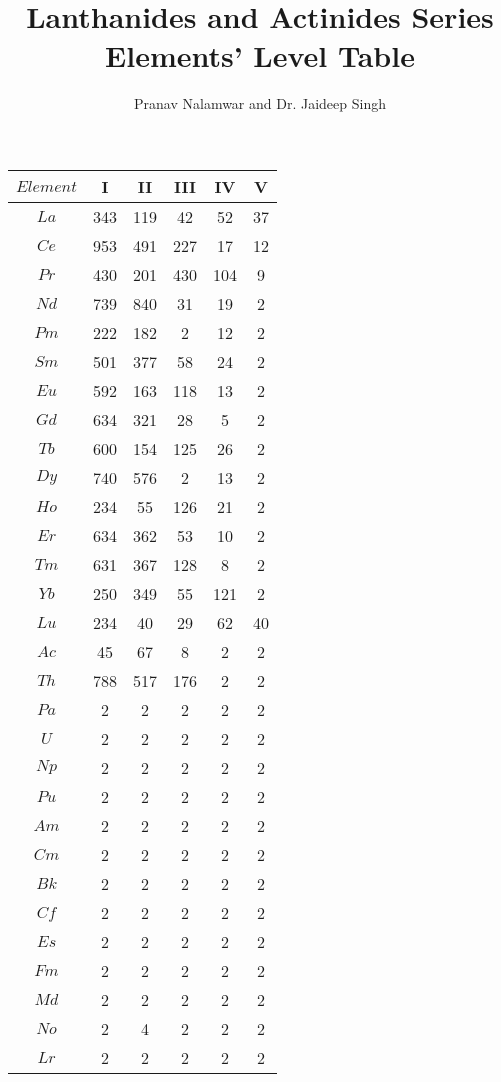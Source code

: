 \documentclass[11pt]{article}
\begin{document}
\title{Lanthanides and Actinides Series Elements' Level Table}
\author{Pranav Nalamwar and Dr. Jaideep Singh}
\maketitle

\begin{tabular}{|c|c|c|c|c|c|}
\hline
$Element$ & I & II & III & IV & V\\ \hline 
$La$ & 343 & 119 & 42 & 52 & 37\\ \hline
$Ce$ & 953 & 491 & 227 & 17 & 12\\ \hline
$Pr$ & 430 & 201 & 430 & 104 & 9\\ \hline
$Nd$ & 739 & 840 & 31 & 19 & 2\\ \hline
$Pm$ & 222 & 182 & 2 & 12 & 2\\ \hline
$Sm$ & 501 & 377 & 58 & 24 & 2	 \\ \hline
$Eu$ & 592 & 163 & 118 & 13 & 2\\ \hline
$Gd$ & 634 & 321 & 28 & 5 & 2\\ \hline
$Tb$ & 600 & 154 & 125 & 26 & 2\\ \hline
$Dy$ & 740 & 576 & 2 & 13 & 2\\ \hline
$Ho$ & 234 & 55  & 126 & 21 & 2\\ \hline
$Er$ & 634 & 362 & 53 & 10 & 2\\ \hline
$Tm$ & 631 & 367 & 128 & 8 & 2\\ \hline
$Yb$ & 250 & 349 & 55 & 121 & 2\\ \hline
$Lu$ & 234 & 40 & 29 & 62 & 40\\ \hline
$Ac$ & 45 & 67 & 8 & 2 & 2\\ \hline
$Th$ & 788 & 517 & 176 & 2 & 2\\ \hline
$Pa$ & 2 & 2 & 2 & 2 & 2 \\ \hline
$U$ & 2 & 2 & 2 & 2 & 2\\ \hline
$Np$ & 2 & 2 & 2 & 2 & 2\\ \hline
$Pu$ & 2 & 2 & 2 & 2 & 2\\ \hline
$Am$ & 2 & 2 & 2& 2 & 2\\ \hline
$Cm$ & 2 & 2 & 2 & 2 & 2\\ \hline
$Bk$ & 2 & 2 & 2 & 2 & 2\\ \hline
$Cf$ & 2 & 2 & 2 & 2 & 2\\ \hline
$Es$ & 2 & 2 & 2 & 2 & 2\\ \hline
$Fm$ & 2 & 2 & 2 & 2 & 2\\ \hline
$Md$ & 2 & 2 & 2 & 2 & 2\\ \hline
$No$ & 2 & 4 & 2 & 2 & 2\\ \hline
$Lr$ & 2 & 2 & 2 & 2 & 2\\ \hline
\end{tabular}
\end{document}
